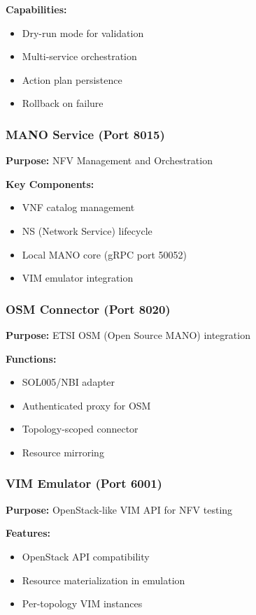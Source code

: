 \documentclass[10pt,a4paper]{article}
\begin{document}
\textbf{Capabilities:}
\begin{itemize}
\item Dry-run mode for validation
\item Multi-service orchestration
\item Action plan persistence
\item Rollback on failure
\end{itemize}

\subsubsection{MANO Service (Port 8015)}
\textbf{Purpose:} NFV Management and Orchestration

\textbf{Key Components:}
\begin{itemize}
\item VNF catalog management
\item NS (Network Service) lifecycle
\item Local MANO core (gRPC port 50052)
\item VIM emulator integration
\end{itemize}

\subsubsection{OSM Connector (Port 8020)}
\textbf{Purpose:} ETSI OSM (Open Source MANO) integration

\textbf{Functions:}
\begin{itemize}
\item SOL005/NBI adapter
\item Authenticated proxy for OSM
\item Topology-scoped connector
\item Resource mirroring
\end{itemize}

\subsubsection{VIM Emulator (Port 6001)}
\textbf{Purpose:} OpenStack-like VIM API for NFV testing

\textbf{Features:}
\begin{itemize}
\item OpenStack API compatibility
\item Resource materialization in emulation
\item Per-topology VIM instances
\end{itemize}
\end{document}
